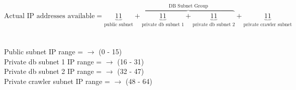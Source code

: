 \\
\\
\[
\text{Actual IP addresses available} = \underbrace{11}_\text{public subnet} + \overbrace{\underbrace{11}_\text{private db subnet 1} + \underbrace{11}_\text{private db subnet 2}}^\text{DB Subnet Group} + \underbrace{11}_\text{private crawler subnet}
\]
\\
\\
Public subnet IP range =  $\rightarrow$ (0 - 15)
\\                                                
Private db subnet 1 IP range =  $\rightarrow$ (16 - 31)
\\                                                
Private db subnet 2 IP range =  $\rightarrow$ (32 - 47)
\\
Private crawler subnet IP range =  $\rightarrow$ (48 - 64)